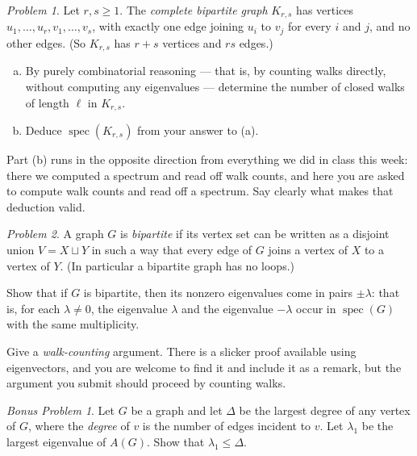 \documentclass[11pt,twoside]{amsart}
\theoremstyle{plain}
\theoremstyle{remark}
\newtheorem{prob}{Problem}
\newtheorem*{bonus*}{Bonus Problem}
\theoremstyle{definition}
\theoremstyle{definition}
\newcommand{\spec}{\operatorname{spec}}
\begin{document}
\begin{prob}
Let $r,s\ge 1$. The \emph{complete bipartite graph} $K_{r,s}$ has vertices
$u_1,\dots,u_r,v_1,\dots,v_s$, with exactly one edge joining $u_i$ to $v_j$ for every $i$ and $j$,
and no other edges. (So $K_{r,s}$ has $r+s$ vertices and $rs$ edges.)
\begin{enumerate}[(a)]
\item By purely combinatorial reasoning --- that is, by counting walks directly, without
computing any eigenvalues --- determine the number of closed walks of length $\ell$ in $K_{r,s}$.
\item Deduce $\spec(K_{r,s})$ from your answer to (a).
\end{enumerate}
Part (b) runs in the opposite direction from everything we did in class this week: there we
computed a spectrum and read off walk counts, and here you are asked to compute walk counts and
read off a spectrum. Say clearly what makes that deduction valid.
\end{prob}

\begin{prob}
A graph $G$ is \emph{bipartite} if its vertex set can be written as a disjoint union
$V = X \sqcup Y$ in such a way that every edge of $G$ joins a vertex of $X$ to a vertex of $Y$.
(In particular a bipartite graph has no loops.)

\smallskip
Show that if $G$ is bipartite, then its nonzero eigenvalues come in pairs $\pm\lambda$: that is,
for each $\lambda\neq 0$, the eigenvalue $\lambda$ and the eigenvalue $-\lambda$ occur in
$\spec(G)$ with the same multiplicity.

\smallskip
Give a \emph{walk-counting} argument. There is a slicker proof available using eigenvectors, and
you are welcome to find it and include it as a remark, but the argument you submit should proceed
by counting walks.
\end{prob}

\begin{bonus*}
Let $G$ be a graph and let $\Delta$ be the largest degree of any vertex of $G$, where the
\emph{degree} of $v$ is the number of edges incident to $v$. Let $\lambda_1$ be the largest
eigenvalue of $A(G)$. Show that $\lambda_1 \le \Delta$.
\end{bonus*}
\end{document}
